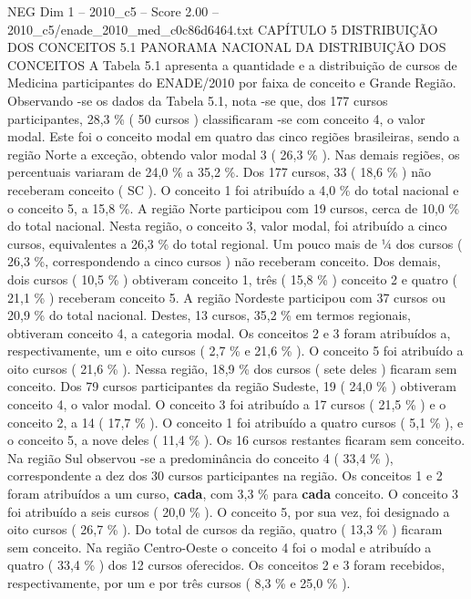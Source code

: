 \begin{textsample}{NEG Dim 1 – 2010\_c5 – Score 2.00 – 2010\_c5/enade\_2010\_med\_c0c86d6464.txt}  \label{ex:f1_neg_305}
CAPÍTULO 5 DISTRIBUIÇÃO DOS CONCEITOS 5.1 PANORAMA NACIONAL DA DISTRIBUIÇÃO DOS CONCEITOS A Tabela 5.1 apresenta a quantidade e a distribuição de cursos de Medicina participantes do ENADE/2010 por faixa de conceito e Grande Região.
Observando -se os dados da Tabela 5.1, nota -se que, dos 177 cursos participantes, 28,3 \% ( 50 cursos ) classificaram -se com conceito 4, o valor modal.
Este foi o conceito modal em quatro das cinco regiões brasileiras, sendo a região Norte a exceção, obtendo valor modal 3 ( 26,3 \% ).
Nas demais regiões, os percentuais variaram de 24,0 \% a 35,2 \%.
Dos 177 cursos, 33 ( 18,6 \% ) não receberam conceito ( SC ).
O conceito 1 foi atribuído a 4,0 \% do total nacional e o conceito 5, a 15,8 \%.
A região Norte participou com 19 cursos, cerca de 10,0 \% do total nacional.
Nesta região, o conceito 3, valor modal, foi atribuído a cinco cursos, equivalentes a 26,3 \% do total regional.
Um pouco mais de ¼ dos cursos ( 26,3 \%, correspondendo a cinco cursos ) não receberam conceito.
Dos demais, dois cursos ( 10,5 \% ) obtiveram conceito 1, três ( 15,8 \% ) conceito 2 e quatro ( 21,1 \% ) receberam conceito 5.
A região Nordeste participou com 37 cursos ou 20,9 \% do total nacional.
Destes, 13 cursos, 35,2 \% em termos regionais, obtiveram conceito 4, a categoria modal.
Os conceitos 2 e 3 foram atribuídos a, respectivamente, um e oito cursos ( 2,7 \% e 21,6 \% ).
O conceito 5 foi atribuído a oito cursos ( 21,6 \% ).
Nessa região, 18,9 \% dos cursos ( sete deles ) ficaram sem conceito.
Dos 79 cursos participantes da região Sudeste, 19 ( 24,0 \% ) obtiveram conceito 4, o valor modal.
O conceito 3 foi atribuído a 17 cursos ( 21,5 \% ) e o conceito 2, a 14 ( 17,7 \% ).
O conceito 1 foi atribuído a quatro cursos ( 5,1 \% ), e o conceito 5, a nove deles ( 11,4 \% ).
Os 16 cursos restantes ficaram sem conceito.
Na região Sul observou -se a predominância do conceito 4 ( 33,4 \% ), correspondente a dez dos 30 cursos participantes na região.
Os conceitos 1 e 2 foram atribuídos a um curso, \textbf{cada}, com 3,3 \% para \textbf{cada} conceito.
O conceito 3 foi atribuído a seis cursos ( 20,0 \% ).
O conceito 5, por sua vez, foi designado a oito cursos ( 26,7 \% ).
Do total de cursos da região, quatro ( 13,3 \% ) ficaram sem conceito.
Na região Centro-Oeste o conceito 4 foi o modal e atribuído a quatro ( 33,4 \% ) dos 12 cursos oferecidos.
Os conceitos 2 e 3 foram recebidos, respectivamente, por um e por três cursos ( 8,3 \% e 25,0 \% ).

\end{textsample}
